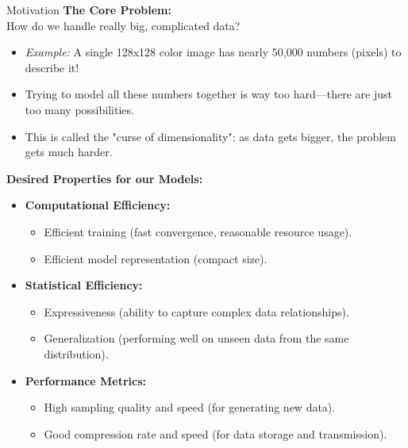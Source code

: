 \begin{frame}[allowframebreaks]{Motivation}
    \textbf{The Core Problem:} \\
    How do we handle really big, complicated data?
    \begin{itemize}
        \item \textit{Example:} A single 128x128 color image has nearly 50,000 numbers (pixels) to describe it!
        \item Trying to model all these numbers together is way too hard—there are just too many possibilities.
        \item This is called the "curse of dimensionality": as data gets bigger, the problem gets much harder.
    \end{itemize}

    \framebreak

    
    \textbf{Desired Properties for our Models:}
    \begin{itemize}
        \item \textbf{Computational Efficiency:}
        \begin{itemize}
            \item Efficient training (fast convergence, reasonable resource usage).
            \item Efficient model representation (compact size).
        \end{itemize}
        \item \textbf{Statistical Efficiency:}
        \begin{itemize}
            \item Expressiveness (ability to capture complex data relationships).
            \item Generalization (performing well on unseen data from the same distribution).
        \end{itemize}
        \item \textbf{Performance Metrics:}
        \begin{itemize}
            \item High sampling quality and speed (for generating new data).
            \item Good compression rate and speed (for data storage and transmission).
        \end{itemize}
    \end{itemize}
    
\end{frame}

